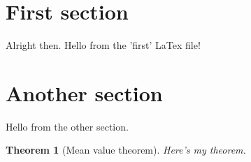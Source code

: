 \documentclass{scrreprt}
\newtheorem{theorem}{Theorem}
\begin{document}
\section{First section}
Alright then. Hello from the 'first' LaTex file!

\section{Another section}
Hello from the other section.

\begin{theorem}[Mean value theorem]
    Here's my theorem.
\end{theorem}
\end{document}
